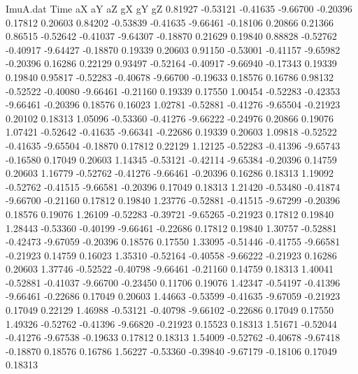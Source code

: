 \begin{filecontents}{ImuA.dat}
Time aX aY aZ gX gY gZ
   0.81927   -0.53121   -0.41635   -9.66700   -0.20396    0.17812    0.20603
   0.84202   -0.53839   -0.41635   -9.66461   -0.18106    0.20866    0.21366
   0.86515   -0.52642   -0.41037   -9.64307   -0.18870    0.21629    0.19840
   0.88828   -0.52762   -0.40917   -9.64427   -0.18870    0.19339    0.20603
   0.91150   -0.53001   -0.41157   -9.65982   -0.20396    0.16286    0.22129
   0.93497   -0.52164   -0.40917   -9.66940   -0.17343    0.19339    0.19840
   0.95817   -0.52283   -0.40678   -9.66700   -0.19633    0.18576    0.16786
   0.98132   -0.52522   -0.40080   -9.66461   -0.21160    0.19339    0.17550
   1.00454   -0.52283   -0.42353   -9.66461   -0.20396    0.18576    0.16023
   1.02781   -0.52881   -0.41276   -9.65504   -0.21923    0.20102    0.18313
   1.05096   -0.53360   -0.41276   -9.66222   -0.24976    0.20866    0.19076
   1.07421   -0.52642   -0.41635   -9.66341   -0.22686    0.19339    0.20603
   1.09818   -0.52522   -0.41635   -9.65504   -0.18870    0.17812    0.22129
   1.12125   -0.52283   -0.41396   -9.65743   -0.16580    0.17049    0.20603
   1.14345   -0.53121   -0.42114   -9.65384   -0.20396    0.14759    0.20603
   1.16779   -0.52762   -0.41276   -9.66461   -0.20396    0.16286    0.18313
   1.19092   -0.52762   -0.41515   -9.66581   -0.20396    0.17049    0.18313
   1.21420   -0.53480   -0.41874   -9.66700   -0.21160    0.17812    0.19840
   1.23776   -0.52881   -0.41515   -9.67299   -0.20396    0.18576    0.19076
   1.26109   -0.52283   -0.39721   -9.65265   -0.21923    0.17812    0.19840
   1.28443   -0.53360   -0.40199   -9.66461   -0.22686    0.17812    0.19840
   1.30757   -0.52881   -0.42473   -9.67059   -0.20396    0.18576    0.17550
   1.33095   -0.51446   -0.41755   -9.66581   -0.21923    0.14759    0.16023
   1.35310   -0.52164   -0.40558   -9.66222   -0.21923    0.16286    0.20603
   1.37746   -0.52522   -0.40798   -9.66461   -0.21160    0.14759    0.18313
   1.40041   -0.52881   -0.41037   -9.66700   -0.23450    0.11706    0.19076
   1.42347   -0.54197   -0.41396   -9.66461   -0.22686    0.17049    0.20603
   1.44663   -0.53599   -0.41635   -9.67059   -0.21923    0.17049    0.22129
   1.46988   -0.53121   -0.40798   -9.66102   -0.22686    0.17049    0.17550
   1.49326   -0.52762   -0.41396   -9.66820   -0.21923    0.15523    0.18313
   1.51671   -0.52044   -0.41276   -9.67538   -0.19633    0.17812    0.18313
   1.54009   -0.52762   -0.40678   -9.67418   -0.18870    0.18576    0.16786
   1.56227   -0.53360   -0.39840   -9.67179   -0.18106    0.17049    0.18313

\end{filecontents}
